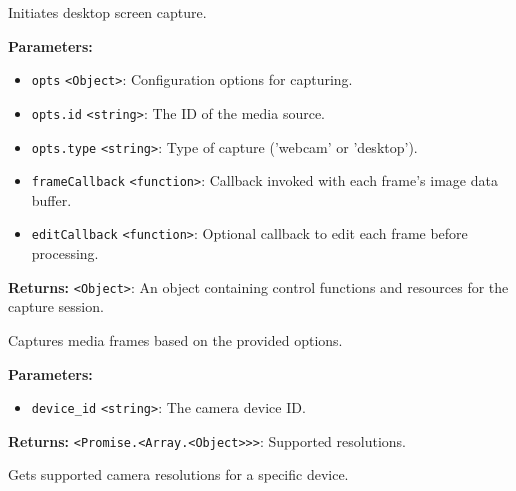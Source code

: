 \documentclass[12pt,a4paper]{article}
\begin{document}
\noindent Initiates desktop screen capture.

\vspace{5mm}
\noindent {}


\noindent \textbf{Parameters:}
\begin{itemize}
  \item \texttt{opts} \texttt{<Object>}: Configuration options for capturing.
  \item \texttt{opts.id} \texttt{<string>}: The ID of the media source.
  \item \texttt{opts.type} \texttt{<string>}: Type of capture ('webcam' or 'desktop').
  \item \texttt{frameCallback} \texttt{<function>}: Callback invoked with each frame's image data buffer.
  \item \texttt{editCallback} \texttt{<function>}: Optional callback to edit each frame before processing.
\end{itemize}

\noindent \textbf{Returns:} \texttt{<Object>}: An object containing control functions and resources for the capture session.

\noindent Captures media frames based on the provided options.

\vspace{5mm}
\noindent {}


\noindent \textbf{Parameters:}
\begin{itemize}
  \item \texttt{device\_id} \texttt{<string>}: The camera device ID.
\end{itemize}

\noindent \textbf{Returns:} \texttt{<Promise.<Array.<Object>>>}: Supported resolutions.

\noindent Gets supported camera resolutions for a specific device.

\vspace{5mm}
\noindent {}
\end{document}
